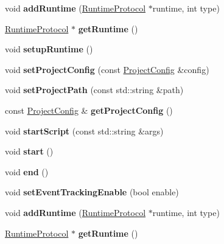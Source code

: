 \begin{DoxyCompactItemize}
void {\bfseries add\+Runtime} (\hyperlink{classRuntimeProtocol}{Runtime\+Protocol} $\ast$runtime, int type)
\item 
\mbox{\label{classRuntimeEngine_a2f3c2690b712c1e622e67453076d785f}} 
\hyperlink{classRuntimeProtocol}{Runtime\+Protocol} $\ast$ {\bfseries get\+Runtime} ()
\item 
\mbox{\label{classRuntimeEngine_a9f760c47b766e3d15f54cf27942cc6f7}} 
void {\bfseries setup\+Runtime} ()
\item 
\mbox{\label{classRuntimeEngine_a7f8f32c6c8dc7b52f372e9c7442fb344}} 
void {\bfseries set\+Project\+Config} (const \hyperlink{classProjectConfig}{Project\+Config} \&config)
\item 
\mbox{\label{classRuntimeEngine_ae81f687b8125fc9dcdb0b6d512c09753}} 
void {\bfseries set\+Project\+Path} (const std\+::string \&path)
\item 
\mbox{\label{classRuntimeEngine_ae8f6933571f60cd82eaa6922ab008991}} 
const \hyperlink{classProjectConfig}{Project\+Config} \& {\bfseries get\+Project\+Config} ()
\item 
\mbox{\label{classRuntimeEngine_a1a95b4d480cc43fe5ba53e117d530ed2}} 
void {\bfseries start\+Script} (const std\+::string \&args)
\item 
\mbox{\label{classRuntimeEngine_afe862e9477f39cde1f15c8cfa66967c4}} 
void {\bfseries start} ()
\item 
\mbox{\label{classRuntimeEngine_a65425c578cef5e2280378f1bc99f9c75}} 
void {\bfseries end} ()
\item 
\mbox{\label{classRuntimeEngine_abad86af43e148e5aa9aa15ac18043569}} 
void {\bfseries set\+Event\+Tracking\+Enable} (bool enable)
\item 
\mbox{\label{classRuntimeEngine_a435d700bbfa07cedaa1796646b5bff98}} 
void {\bfseries add\+Runtime} (\hyperlink{classRuntimeProtocol}{Runtime\+Protocol} $\ast$runtime, int type)
\item 
\mbox{\label{classRuntimeEngine_a101a5e4cd6ccef70bd340e196cee337a}} 
\hyperlink{classRuntimeProtocol}{Runtime\+Protocol} $\ast$ {\bfseries get\+Runtime} ()
\end{DoxyCompactItemize}
